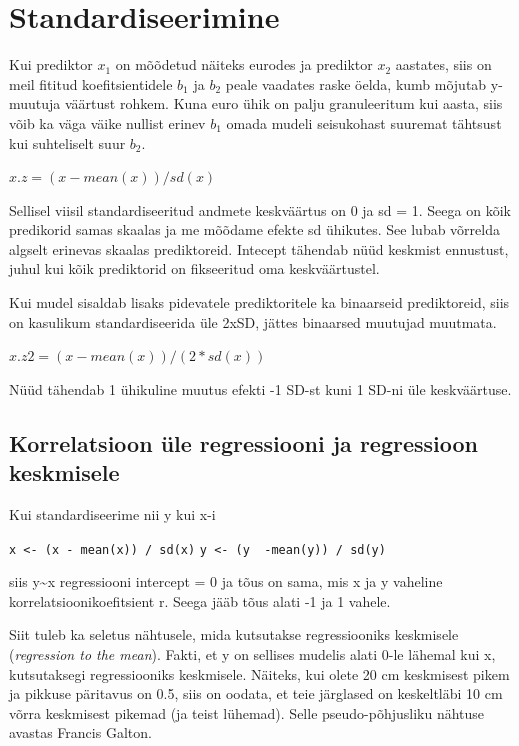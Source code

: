 \documentclass[]{book}
\begin{document}
\hypertarget{standardiseerimine}{%
\section{Standardiseerimine}\label{standardiseerimine}}

Kui prediktor \(x_1\) on mõõdetud näiteks eurodes ja prediktor \(x_2\) aastates, siis on meil fititud koefitsientidele \(b_1\) ja \(b_2\) peale vaadates raske öelda, kumb mõjutab y-muutuja väärtust rohkem. Kuna euro ühik on palju granuleeritum kui aasta, siis võib ka väga väike nullist erinev \(b_1\) omada mudeli seisukohast suuremat tähtsust kui suhteliselt suur \(b_2\).

\(x.z = (x - mean(x))/sd(x)\)

Sellisel viisil standardiseeritud andmete keskväärtus on 0 ja sd = 1. Seega on kõik predikorid samas skaalas ja me mõõdame efekte sd ühikutes. See lubab võrrelda algselt erinevas skaalas prediktoreid. Intecept tähendab nüüd keskmist ennustust, juhul kui kõik prediktorid on fikseeritud oma keskväärtustel.

Kui mudel sisaldab lisaks pidevatele prediktoritele ka binaarseid prediktoreid, siis on kasulikum standardiseerida üle 2xSD, jättes binaarsed muutujad muutmata.

\(x.z2 = (x - mean(x))/(2 * sd(x))\)

Nüüd tähendab 1 ühikuline muutus efekti -1 SD-st kuni 1 SD-ni üle keskväärtuse.

\hypertarget{korrelatsioon-ule-regressiooni-ja-regressioon-keskmisele}{%
\subsection*{Korrelatsioon üle regressiooni ja regressioon keskmisele}\label{korrelatsioon-ule-regressiooni-ja-regressioon-keskmisele}}

Kui standardiseerime nii y kui x-i

\texttt{x\ \textless{}-\ (x\ -\ mean(x))\ /\ sd(x)}
\texttt{y\ \textless{}-\ (y\ \ -mean(y))\ /\ sd(y)}

siis y\textasciitilde{}x regressiooni intercept = 0 ja tõus on sama, mis x ja y vaheline korrelatsioonikoefitsient r.
Seega jääb tõus alati -1 ja 1 vahele.

Siit tuleb ka seletus nähtusele, mida kutsutakse regressiooniks keskmisele (\emph{regression to the mean}). Fakti, et y on sellises mudelis alati 0-le lähemal kui x, kutsutaksegi regressiooniks keskmisele. Näiteks, kui olete 20 cm keskmisest pikem ja pikkuse päritavus on 0.5, siis on oodata, et teie järglased on keskeltläbi 10 cm võrra keskmisest pikemad (ja teist lühemad). Selle pseudo-põhjusliku nähtuse avastas Francis Galton.
\end{document}
